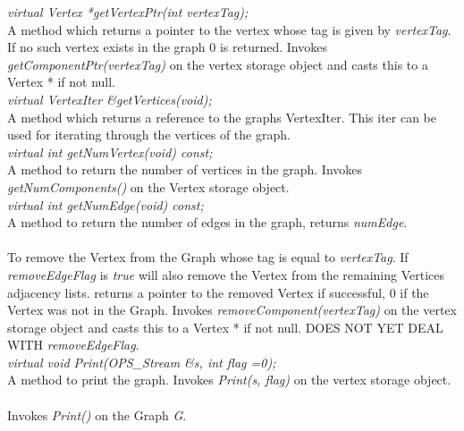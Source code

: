 {\em virtual Vertex *getVertexPtr(int vertexTag);} \\
A method which returns a pointer to the vertex whose tag is given by {\em
vertexTag}. If no such vertex exists in the graph $0$ is
returned. Invokes {\em getComponentPtr(vertexTag)} on the vertex
storage object and casts this to a Vertex * if not null. \\

{\em virtual VertexIter \&getVertices(void);} \\
A method which returns a reference to the graphs VertexIter. This iter
can be used for iterating through the vertices of the graph. \\

{\em virtual int getNumVertex(void) const;} \\
A method to return the number of vertices in the graph. Invokes {\em
getNumComponents()} on the Vertex storage object.\\

{\em virtual int getNumEdge(void) const;} \\
A method to return the number of edges in the graph, returns {\em
numEdge}. \\ 

 \\
To remove the Vertex from the Graph whose tag is equal to {\em
vertexTag}. If {\em removeEdgeFlag} is {\em true} will also remove the
Vertex from the remaining Vertices adjacency lists. returns a pointer
to the removed Vertex if successful, $0$ if the Vertex was not in the
Graph. Invokes {\em removeComponent(vertexTag)} on the vertex
storage object and casts this to a Vertex * if not null. DOES NOT YET
DEAL WITH {\em removeEdgeFlag}. \\

{\em virtual void Print(OPS_Stream \&s, int flag =0);} \\
A method to print the graph. Invokes {\em Print(s, flag)} on the vertex
storage object. \\

 \\
Invokes {\em Print()} on the Graph {\em G}.